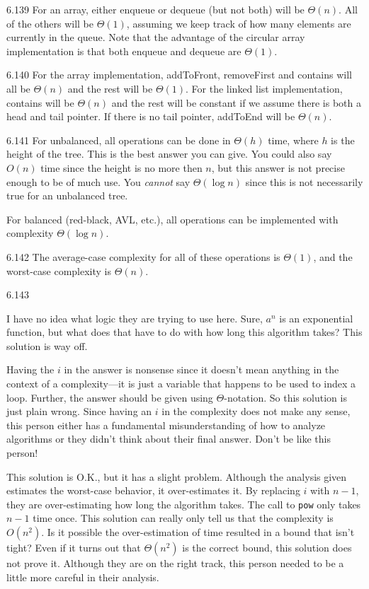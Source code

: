 \begin{Answer}{6.139}
For an array, either enqueue or dequeue (but not both) will be $\Theta(n)$.
All of the others will be $\Theta(1)$, assuming we keep track of how many elements
are currently in the queue.  Note that the advantage of the circular array implementation
is that both enqueue and dequeue are $\Theta(1)$.
\end{Answer}
\begin{Answer}{6.140}
For the array implementation, addToFront, removeFirst and contains will all be $\Theta(n)$
and the rest will be $\Theta(1)$.
For the linked list implementation, contains will be $\Theta(n)$ and the rest will be
constant if we assume there is both a head and tail pointer.  If there is no tail pointer,
addToEnd will be $\Theta(n)$.
\end{Answer}
\begin{Answer}{6.141}
For unbalanced, all operations can be done in $\Theta(h)$ time, where $h$ is the height
of the tree.  This is the best answer you can give.  You could also say $O(n)$ time since
the height is no more then $n$, but this answer is not precise enough to be of much use.
You {\em cannot} say $\Theta(\log n)$ since
this is not necessarily true for an unbalanced tree.

For balanced (red-black, AVL, etc.), all operations can be implemented with complexity $\Theta(\log n)$.
\end{Answer}
\begin{Answer}{6.142}
The average-case complexity for all of these operations is $\Theta(1)$,
and the worst-case complexity is $\Theta(n)$.
\end{Answer}
\begin{Answer}{6.143}
\begin{solevalenum}
\item
I have no idea what logic they are trying to use here.  Sure, $a^n$ is an exponential
function, but what does that have to do with how long this algorithm takes?
This solution is way off.
\item
Having the $i$ in the answer is nonsense since it doesn't mean
anything in the context of a complexity---it is just a variable that happens to be
used to index a loop.  Further, the answer should be given using
$\Theta$-notation.  So this solution is just plain wrong.
Since having an $i$ in the complexity does not make any sense, this person either
has a fundamental misunderstanding of how to analyze algorithms or they didn't
think about their final answer.  Don't be like this person!
\item
This solution is O.K., but it has a slight problem.  Although the analysis given estimates
the worst-case behavior, it over-estimates it.  By replacing $i$ with $n-1$, they are
over-estimating how long the algorithm takes.
The call to \verb+pow+ only takes $n-1$ time once.
This solution can really only tell us
that the complexity is $O(n^2)$.  Is it possible the over-estimation of time resulted
in a bound that isn't tight?  Even if it turns out that $\Theta(n^2)$ is the correct bound,
this solution does not prove it.
Although they are on the right track,
this person needed to be a little more careful in their analysis.
\end{solevalenum}
\end{Answer}
